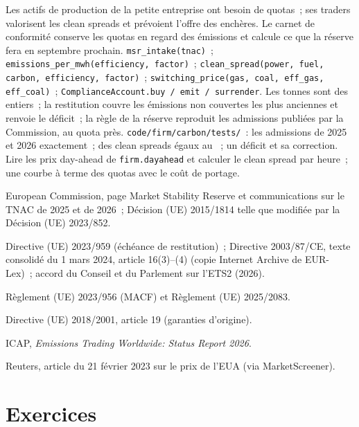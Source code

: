 \begin{build}
 Les actifs de production de la petite entreprise ont besoin de quotas~; ses traders valorisent les clean
spreads et prévoient l'offre des enchères. Le carnet de conformité conserve les quotas en regard des émissions et
calcule ce que la réserve fera en septembre prochain.
 \texttt{msr\_intake(tnac)}~; \texttt{emissions\_per\_mwh(efficiency, factor)}~;
\texttt{clean\_spread(power, fuel, carbon, efficiency, factor)}~; \texttt{switching\_price(gas, coal,
eff\_gas, eff\_coal)}~; \texttt{ComplianceAccount.buy / emit / surrender}.
 Les tonnes sont des entiers~; la restitution couvre les émissions non couvertes les plus anciennes et renvoie le
déficit~; la règle de la réserve reproduit les admissions publiées par la Commission, au quota près.
 \texttt{code/firm/carbon/tests/}~: les admissions de 2025 et 2026 exactement~; des clean spreads égaux
au ~; un déficit et sa correction.
 Lire les prix day-ahead de \texttt{firm.dayahead} et calculer le clean
spread par heure~; une courbe à terme des quotas avec le coût de portage.
\end{build}

\begin{omsources}
\item European Commission, page Market Stability Reserve et communications sur le TNAC de 2025
et de 2026~; Décision (UE) 2015/1814 telle que modifiée par la Décision (UE) 2023/852.
\item Directive (UE) 2023/959 (échéance de restitution)~; Directive 2003/87/CE, texte consolidé du 1 mars 2024, article 16(3)--(4)
(copie Internet Archive de EUR-Lex)~; accord du Conseil et du Parlement sur l'ETS2 (2026).
\item Règlement (UE) 2023/956 (MACF) et Règlement (UE) 2025/2083.
\item Directive (UE) 2018/2001, article 19 (garanties d'origine).
\item ICAP, \emph{Emissions Trading Worldwide: Status Report 2026}.
\item Reuters, article du 21 février 2023 sur le prix de l'EUA (via MarketScreener).
\end{omsources}

\section{Exercices}

